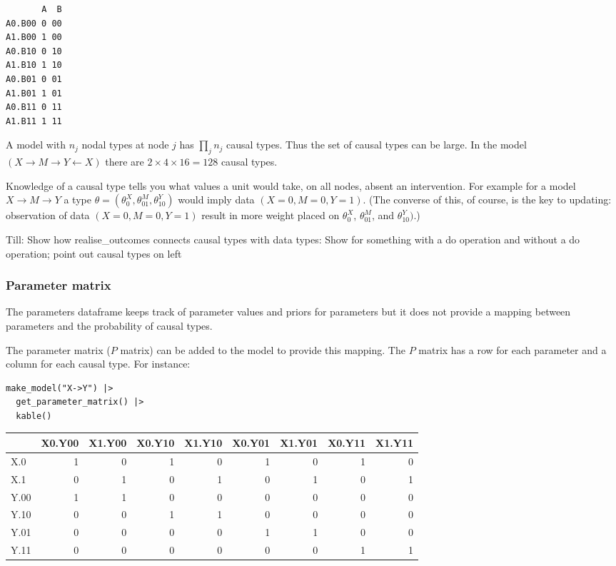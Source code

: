 \documentclass[
  article]{jss}
\begin{document}
\begin{verbatim}
       A  B
A0.B00 0 00
A1.B00 1 00
A0.B10 0 10
A1.B10 1 10
A0.B01 0 01
A1.B01 1 01
A0.B11 0 11
A1.B11 1 11
\end{verbatim}

A model with \(n_j\) nodal types at node \(j\) has \(\prod_jn_j\) causal
types. Thus the set of causal types can be large. In the model
\((X\rightarrow M \rightarrow Y \leftarrow X)\) there are
\(2\times 4\times 16 = 128\) causal types.

Knowledge of a causal type tells you what values a unit would take, on
all nodes, absent an intervention. For example for a model
\(X \rightarrow M \rightarrow Y\) a type
\(\theta = (\theta^X_0, \theta^M_{01}, \theta^Y_{10})\) would imply data
\((X=0, M=0, Y=1)\). (The converse of this, of course, is the key to
updating: observation of data \((X=0, M=0, Y=1)\) result in more weight
placed on \(\theta^X_0\), \(\theta^M_{01}\), and \(\theta^Y_{10})\).)

Till: Show how realise\_outcomes connects causal types with data types:
Show for something with a do operation and without a do operation; point
out causal types on left

\hypertarget{parameter-matrix}{%
\subsubsection{Parameter matrix}\label{parameter-matrix}}

The parameters dataframe keeps track of parameter values and priors for
parameters but it does not provide a mapping between parameters and the
probability of causal types.

The parameter matrix (\(P\) matrix) can be added to the model to provide
this mapping. The \(P\) matrix has a row for each parameter and a column
for each causal type. For instance:

\begin{verbatim}
make_model("X->Y") |> 
  get_parameter_matrix() |>
  kable()
\end{verbatim}

\begin{longtable}[]{@{}lrrrrrrrr@{}}
\toprule\noalign{}
& X0.Y00 & X1.Y00 & X0.Y10 & X1.Y10 & X0.Y01 & X1.Y01 & X0.Y11 &
X1.Y11 \\
\midrule\noalign{}
\endhead
\bottomrule\noalign{}
\endlastfoot
X.0 & 1 & 0 & 1 & 0 & 1 & 0 & 1 & 0 \\
X.1 & 0 & 1 & 0 & 1 & 0 & 1 & 0 & 1 \\
Y.00 & 1 & 1 & 0 & 0 & 0 & 0 & 0 & 0 \\
Y.10 & 0 & 0 & 1 & 1 & 0 & 0 & 0 & 0 \\
Y.01 & 0 & 0 & 0 & 0 & 1 & 1 & 0 & 0 \\
Y.11 & 0 & 0 & 0 & 0 & 0 & 0 & 1 & 1 \\
\end{longtable}
\end{document}
